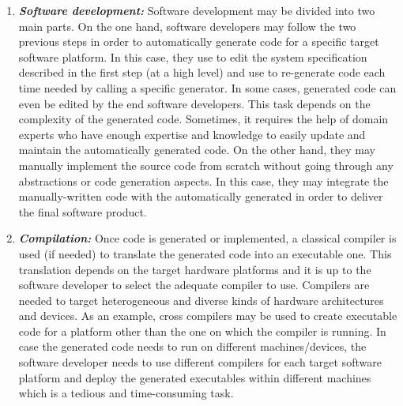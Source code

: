 \begin{enumerate}
	
	
	\item \textbf{\textit{Software development:}}
	Software development may be divided into two main parts. On the one hand, software developers may follow the two previous steps in order to automatically generate code for a specific target software platform. In this case, they use to edit the system specification described in the first step (at a high level) and use to re-generate code each time needed by calling a specific generator. In some cases, generated code can even be edited by the end software developers. This task depends on the complexity of the generated code. Sometimes, it requires the help of domain experts who have enough expertise and knowledge to easily update and maintain the automatically generated code. On the other hand, they may manually implement the source code from scratch without going through any abstractions or code generation aspects. In this case, they may integrate the manually-written code with the automatically generated in order to deliver the final software product.
	
	\item \textbf{\textit{Compilation:}}
	Once code is generated or implemented, a classical compiler is used (if needed) to translate the generated code into an executable one. This translation depends on the target hardware platforms and it is up to the software developer to select the adequate compiler to use. Compilers are needed to target heterogeneous and diverse kinds of hardware architectures and devices. 
	As an example, cross compilers may be used to create executable code for a platform other than the one on which the compiler is running. In case the generated code needs to run on different machines/devices, the software developer needs to use different compilers for each target software platform and deploy the generated executables within different machines which is a tedious and time-consuming task.
	
\end{enumerate} 


